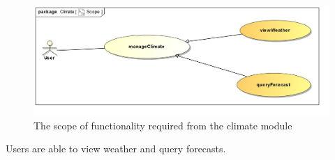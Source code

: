 
\begin{figure}[H]
	\centering
	\includegraphics[scale=0.3]{../images/funcReq/ClimateScope.jpg}
	\caption{The scope of functionality required from the climate module \label{overflow}}
\end{figure} Users are able to view weather and query forecasts.